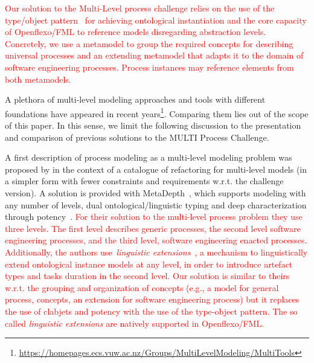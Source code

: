 

\textcolor{red}{Our solution to the Multi-Level process challenge relies on the use of the type/object pattern~\citep{typeObject} for achieving ontological instantiation and the core capacity of Openflexo/FML to reference models disregarding abstraction levels. Concretely, we use a metamodel to group the required concepts for describing universal processes and an extending metamodel that adapts it to the domain of software engineering processes. Process instances may reference elements from both metamodels.}

A plethora of multi-level modeling approaches and tools with different foundations have appeared in recent years\footnote{\url{https://homepages.ecs.vuw.ac.nz/Groups/MultiLevelModeling/MultiTools}}. Comparing them lies out of the scope of this paper. In this sense, we limit the following discussion to the presentation and comparison of previous solutions to the MULTI Process Challenge.

A first description of process modeling as a multi-level modeling problem was proposed by \parencite{lara2018refactoring} in the context of a catalogue of refactoring for multi-level models (in a simpler form with fewer constraints and requirements w.r.t. the challenge version). A solution is provided with MetaDepth~\parencite{metadepth}, which supports modeling with any number of levels, dual ontological/linguistic typing and deep characterization through potency~\citep{potency}. \textcolor{red}{For their solution to the multi-level process problem they use three levels. The first level describes generic processes, the second level software engineering processes, and the third level, software engineering enacted processes. Additionally, the authors use~\emph{linguistic extensions}~\citep{metadepth}, a mechanism to  linguistically extend ontological instance models at any level, in order to introduce artefact types and tasks duration in the second level. Our solution is similar to theirs w.r.t. the grouping and organization of concepts (e.g., a model for general process, concepts, an extension for software engineering process) but it replaces the use of clabjets and potency with the use of the type-object pattern. The so called \emph{linguistic extensions} are natively supported in Openflexo/FML.}

